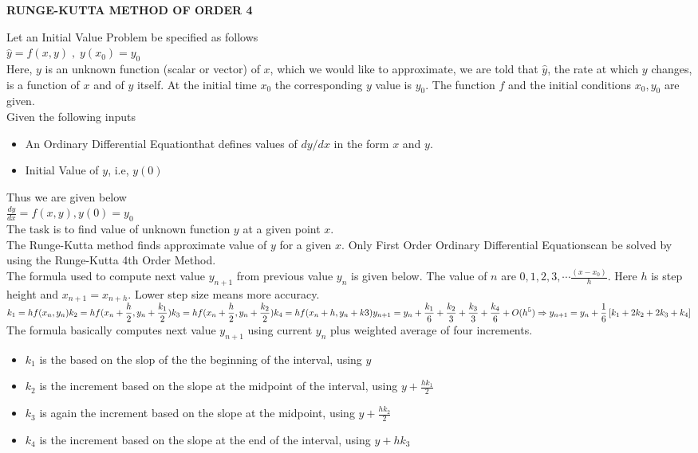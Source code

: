 \documentclass[a4paper 11pt]{article}
\newcommand{\IVP}{Initial Value Problem }
\newcommand{\dsp}{\displaystyle}
\newcommand{\be}{\(\dsp} %
\newcommand{\ee}{\)\\[0.3cm]} %
\newcommand{\imp}{\Rightarrow}
\renewcommand{\sp}{\\[0.3cm]}
\newcommand{\ODE}{Ordinary Differential Equation}
\newcommand{\ODEs}{Ordinary Differential Equations}
\begin{document}
\begin{center}
\textbf{RUNGE-KUTTA METHOD OF ORDER 4} \\
\end{center}
Let an \IVP be specified as follows\sp
\be
\hat{y} = f(x,y) \; , \; y(x_0) = y_0
\ee
Here, \(y\) is an unknown function (scalar or vector) of \(x\), which  we would like to approximate, we are told that \(\dsp \hat{y}\), the rate at which \(\dsp y\) changes, is a function of \(\dsp x\) and of \(\dsp y\) itself. At the initial time \(\dsp x_0\) the corresponding \(\dsp y\) value is \(\dsp y_0\). The function \(\dsp f\) and the initial conditions \(\dsp x_0, y_0\) are given.\sp
Given the following inputs\sp
\begin{itemize}
	\item An \ODE that defines values of \( dy/ dx \) in the form \(\dsp x\) and \(\dsp y\).
	\item Initial Value of \(\dsp y\), i.e, \(\dsp y(0)\)
\end{itemize}
Thus we are given below\sp
\be
\frac{dy}{dx} = f(x,y), y(0) = y_0
\ee
The task is to find value of unknown function \(\dsp y\) at a given point \(\dsp x\).\sp
The Runge-Kutta method finds approximate value of \(\dsp y\) for a given \(\dsp x\). Only First Order \ODEs can be solved by using the Runge-Kutta 4th Order Method.\sp
The formula used to compute next value \(y_{n+1}\) from previous value \(y_n\) is given below. The value of \(n\) are \(\dsp  0,1,2,3,\cdots \frac{(x-x_0)}{h}\). Here \(h\) is step height and \(\dsp x_{n+1} = x_{n+h}\). Lower step size means more accuracy.\sp
\be
k_1 = hf(x_n,y_n)\sp
k_2 = hf(x_n +\frac{h}{2}, y_n + \frac{k_1}{2}) \sp
k_3 = hf(x_n + \frac{h}{2}, y_n + \frac{k_2}{2}) \sp
k_4 = hf(x_n + h, y_n + k3) \sp
y_{n+1} = y_n + \frac{k_1}{6} + \frac{k_2}{3} + \frac{k_3}{3} + \frac{k_4}{6} + O(h^5)\sp
\imp y_{n+1} = y_n + \frac{1}{6}\left[ k_1 + 2k_2 + 2k_3 + k_4 \right]
\ee
The formula basically computes next value \(y_{n+1}\) using current \(y_n\) plus weighted average of four increments.
\begin{itemize}
	\item \(k_1\) is the based on the slop of the the beginning of the interval, using \(y\)
	\item \(k_2\) is the increment based on the slope at the midpoint of the interval, using \(\dsp y + \frac{hk_1}{2}\)
	\item \(k_3\) is again the increment based on the slope at the midpoint, using \(\dsp y + \frac{hk_2}{2}\)
	\item \(k_4\) is the increment based on the slope at the end of the interval, using \(y + hk_3\)
\end{itemize}
\end{document}

